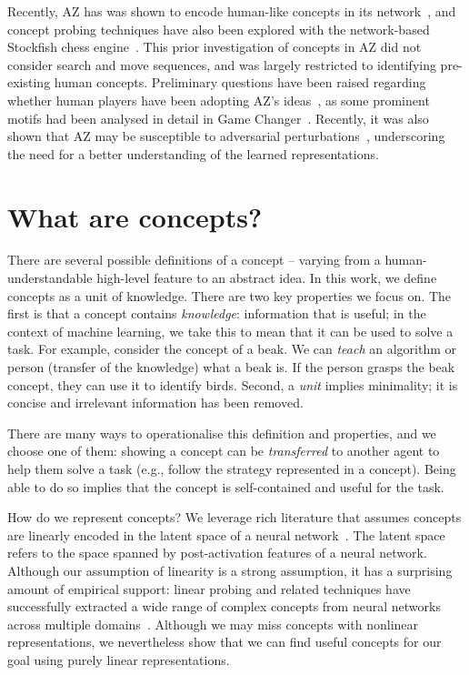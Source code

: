 \documentclass{article}
\begin{document}
Recently, AZ has was shown to encode human-like concepts in its network~\citep{mcgrath2022acquisition}, and concept probing techniques have also been explored with the network-based Stockfish chess engine~\citep{palssonunveiling}. This prior investigation of concepts in AZ did not consider search and move sequences, and was largely restricted to identifying pre-existing human concepts. Preliminary questions have been raised regarding whether human players have been adopting AZ's ideas~\citep{gonzalez2022alphazero}, as some prominent motifs had been analysed in detail in Game Changer~\citep{game_changer}. Recently, it was also shown that AZ may be susceptible to adversarial perturbations~\citep{lan2022alphazerolike}, underscoring the need for a better understanding of the learned representations. 

\section{What are concepts?\label{sec:assumptions_defs}} \label{sec:assumptions}
There are several possible definitions of a concept -- varying from a human-understandable high-level feature to an abstract idea.
In this work, we define concepts as a unit of knowledge. 
There are two key properties we focus on. 
The first is that a concept contains \textit{knowledge}: information that is useful; in the context of machine learning, we take this to mean that it can be used to solve a task. 
For example, consider the concept of a beak. We can \textit{teach} an algorithm or person (transfer of the knowledge) what a beak is. If the person grasps the beak concept, they can use it to identify birds. 
Second, a \textit{unit} implies minimality; it is concise and irrelevant information has been removed. 

There are many ways to operationalise this definition and properties, and we choose one of them: showing a concept can be \textit{transferred} to another agent to help them solve a task (e.g., follow the strategy represented in a concept). Being able to do so implies that the concept is self-contained and useful for the task. 

How do we represent concepts? We leverage rich literature that assumes 
concepts are linearly encoded in the latent space of a neural network~\citep{mcgrath2022acquisition, kim2018interpretability, gurnee2023finding, conneau2018you, tenney2019bert, nanda_othello_2023}. The latent space refers to the space spanned by post-activation features of a neural network. 
Although our assumption of linearity is a strong assumption, it has a surprising amount of empirical support: linear probing and related techniques have successfully extracted a wide range of complex concepts from neural networks across multiple domains~\citep{mcgrath2022acquisition, kim2018interpretability, gurnee2023finding, conneau2018you, tenney2019bert, nanda_othello_2023}. 
Although we may miss concepts with nonlinear representations, we nevertheless show that we can find useful concepts for our goal using purely linear representations.  
\end{document}
